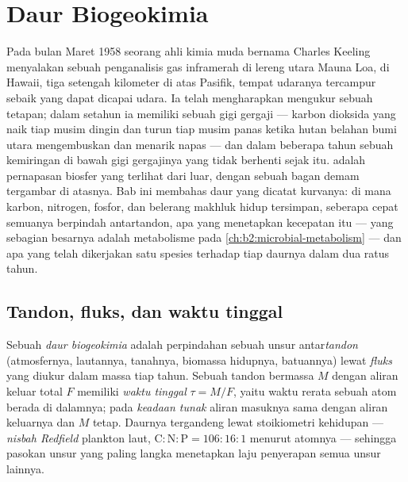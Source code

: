 \chapter{Daur Biogeokimia}\label{ch:b2:biogeochemical-cycles}

Pada bulan Maret 1958 seorang ahli kimia muda bernama Charles Keeling
menyalakan sebuah penganalisis gas inframerah di lereng utara Mauna
Loa, di Hawaii, tiga setengah kilometer di atas Pasifik, tempat
udaranya tercampur sebaik yang dapat dicapai udara. Ia telah
mengharapkan mengukur sebuah tetapan; dalam setahun ia memiliki sebuah
gigi gergaji --- karbon dioksida yang naik tiap musim dingin dan turun
tiap musim panas ketika hutan belahan bumi utara mengembuskan dan
menarik napas --- dan dalam beberapa tahun sebuah kemiringan di bawah
gigi gergajinya yang tidak berhenti sejak itu.  adalah
pernapasan biosfer yang terlihat dari luar, dengan sebuah bagan demam
tergambar di atasnya. Bab ini membahas daur yang dicatat kurvanya: di
mana karbon, nitrogen, fosfor, dan belerang makhluk hidup tersimpan,
seberapa cepat semuanya berpindah antartandon, apa yang menetapkan
kecepatan itu --- yang sebagian besarnya adalah metabolisme pada
\cref{ch:b2:microbial-metabolism} --- dan apa yang telah dikerjakan
satu spesies terhadap tiap daurnya dalam dua ratus tahun.

\section{Tandon, fluks, dan waktu tinggal}

\begin{definition}\label{def:b2:biogeochemical-cycles:reservoir}
Sebuah \emph{daur biogeokimia} adalah perpindahan sebuah unsur
antar\emph{tandon} (atmosfernya, lautannya, tanahnya, biomassa
hidupnya, batuannya) lewat \emph{fluks} yang diukur dalam massa tiap
tahun. Sebuah tandon bermassa $M$ dengan aliran keluar total $F$
memiliki \emph{waktu tinggal} $\tau = M/F$, yaitu waktu rerata sebuah
atom berada di dalamnya; pada \emph{keadaan tunak} aliran masuknya sama
dengan aliran keluarnya dan $M$ tetap. Daurnya tergandeng lewat
stoikiometri kehidupan --- \emph{nisbah Redfield} plankton laut,
$\mathrm{C:N:P} =
106:16:1$ menurut atomnya --- sehingga pasokan unsur
yang paling langka menetapkan laju penyerapan semua unsur lainnya.
\end{definition}


